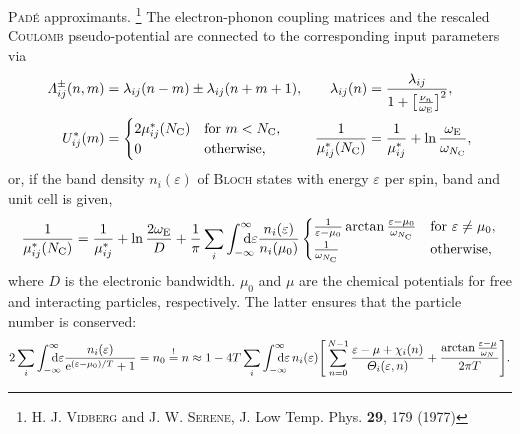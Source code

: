 \documentclass[a4paper]{article}
\def\D{\mathrm d}
\def\E{\mathrm e}
\def\sub#1{\sb{\mathrm{#1}}}
\def\from#1{\sb{\mathrlap{#1}}}
\def\till#1{\sp{\mathrlap{#1}}}
\let\epsilon\varepsilon
\let\Lambda\varLambda
\let\Theta\varTheta
\begin{document}
   \textsc{Padé} approximants.%
   \footnote{%
      H. J. \textsc{Vidberg} and J. W. \textsc{Serene}, J. Low Temp. Phys.
      \textbf{29}, 179 (1977)
      }
   The electron-phonon coupling matrices and the
   rescaled \textsc{Coulomb} pseudo-potential are connected to the corresponding
   input parameters via
   \begin{align*}
      \Lambda_{i j}^\pm(n, m) &=
      \lambda_{i j}(n - m) \pm \lambda_{i j}(n + m + 1),
      &
      \lambda_{i j}(n) &=
      \frac {\lambda_{i j}}{1 + \big[ \frac{\nu_n}{\omega \sub E} \big]^2},
      \\
      U^*_{i j}(m) &=
      \begin{cases}
         2 \mu^*_{i j}(N \sub C) & \text{for $m < N \sub C$,} \\
         0                       & \text{otherwise,}
      \end{cases}
      &
      \frac 1 {\mu^*_{i j}(N \sub C)} &=
      \frac 1 {\mu^*_{i j}} + \ln \frac{\omega \sub E}{\omega_{N \sub C}},
   \end{align*}
   or, if the band density $n_i(\epsilon)$ of \textsc{Bloch} states with energy
   $\epsilon$ per spin, band and unit cell is given,
   \begin{equation*}
       \frac 1 {\mu^*_{i j}(N \sub C)} =
       \frac 1 {\mu^*_{i j}} + \ln \frac {2 \omega \sub E} D +
       \frac 1 \pi \sum_i \int \from{-\infty} \till \infty \D \epsilon
       \frac{n_i(\epsilon)}{n_i(\mu_0)}
       \begin{cases}
           \frac 1 {\epsilon - \mu_0}
           \arctan \frac{\epsilon - \mu_0}{\omega_{N \sub C}}
               & \text{for $\epsilon \neq \mu_0$,} \\
           \frac 1 {\omega_{N \sub C}}
               & \text{otherwise,}
       \end{cases}
   \end{equation*}
   where $D$ is the electronic bandwidth. $\mu_0$ and $\mu$ are the chemical
   potentials for free and interacting particles, respectively. The latter
   ensures that the particle number is conserved:
   \begin{equation*}
      2 \sum_i \int \from{-\infty} \till \infty \D \epsilon
      \frac{n_i(\epsilon)}{\E^{(\epsilon - \mu_0) / T} + 1}
      = n_0 \overset ! = n
      \approx 1 - 4 T \sum_i \int \from{-\infty} \till \infty \D \epsilon \,
      n_i(\epsilon)
      \Bigg[
         \sum_{n = 0}^{N - 1}
         \frac{\epsilon - \mu + \chi_i(n)}{\Theta_i(\epsilon, n)}
         + \frac{\arctan \frac{\epsilon - \mu}{\omega_N}}{2 \pi T}
      \Bigg].
   \end{equation*}
\end{document}

